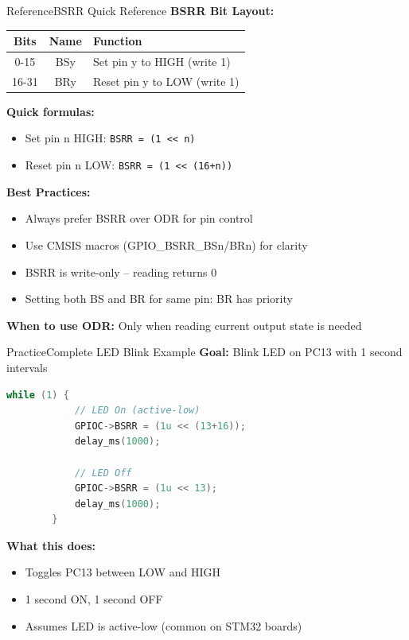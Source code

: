 \documentclass{beamer}
\begin{document}
\begin{frame}{Reference}{BSRR Quick Reference}
	\textbf{BSRR Bit Layout:}
	\begin{center}
		\small
		\begin{tabular}{|c|c|l|}
			\hline
			\textbf{Bits} & \textbf{Name} & \textbf{Function} \\ \hline
			0-15 & BSy & Set pin y to HIGH (write 1) \\ \hline
			16-31 & BRy & Reset pin y to LOW (write 1) \\ \hline
		\end{tabular}
	\end{center}
	
	\medskip
	\textbf{Quick formulas:}
	\begin{itemize}
		\item Set pin n HIGH: \texttt{BSRR = (1 << n)}
		\item Reset pin n LOW: \texttt{BSRR = (1 << (16+n))}
	\end{itemize}
	
	\medskip
	\textbf{Best Practices:}
	\begin{itemize}
		\item Always prefer BSRR over ODR for pin control
		\item Use CMSIS macros (GPIO\_BSRR\_BSn/BRn) for clarity
		\item BSRR is write-only – reading returns 0
		\item Setting both BS and BR for same pin: BR has priority
	\end{itemize}
	
	\medskip
	\textbf{When to use ODR:} Only when reading current output state is needed
\end{frame}
\begin{frame}[fragile]{Practice}{Complete LED Blink Example}
	\textbf{Goal:} Blink LED on PC13 with 1 second intervals
	
	\begin{lstlisting}[language=C, basicstyle=\ttfamily\footnotesize]
		while (1) {
			// LED On (active-low)
			GPIOC->BSRR = (1u << (13+16));
			delay_ms(1000);
			
			// LED Off
			GPIOC->BSRR = (1u << 13);
			delay_ms(1000);
		}
	\end{lstlisting}
	
	\textbf{What this does:}
	\begin{itemize}
		\item Toggles PC13 between LOW and HIGH
		\item 1 second ON, 1 second OFF
		\item Assumes LED is active-low (common on STM32 boards)
	\end{itemize}
\end{frame}
\end{document}
